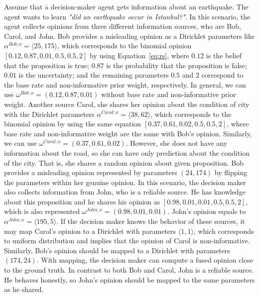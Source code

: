 \documentclass[a4,12pt]{ozu-thesis}
\begin{document}
Assume that a decision-maker agent gets information about an earthquake. The agent wants to learn \textit{"did an earthquake occur in Istanbul?"}. In this scenario, the agent collects opinions from three different information sources, who are Bob, Carol, and John. Bob provides a misleading opinion as a Dirichlet parameters like $\alpha^{Bob:x} = \langle 25, 175 \rangle$, which corresponds to the binomial opinion  $\left [ 0.12, 0.87, 0.01, 0.5, 0.5, 2 \right ]$  by using Equation~\ref{eq:rs}, where $0.12$ is the belief that the proposition is true; $0.87$ is the probability that the proposition is false; $0.01$ is the uncertainty; and the remaining parameters $0.5$ and $2$ correspond to the base rate and non-informative prior weight, respectively. In general, we can use $\omega^{Bob:x} = \left ( 0.12, 0.87, 0.01 \right ) $ without base rate and non-informative prior weight. Another source Carol, she shares her opinion about the condition of city with the Dirichlet parameters $\alpha^{Carol:x} = \langle 38, 62 \rangle$, which corresponds to the binomial opinion by using the same equation  $\left [ 0.37, 0.61, 0.02, 0.5, 0.5, 2 \right ]$, where base rate and non-informative weight are the same with Bob's opinion. Similarly, we can use $\omega^{Carol:x} = \left ( 0.37, 0.61, 0.02 \right ) $. However, she does not have any information about the road, so she can have only prediction about the condition of the city. That is, she shares a random opinion about given proposition. Bob provides a misleading opinion represented by parameters $\left( 24, 174 \right)$ by flipping the parameters within her genuine opinion.  In this scenario, the decision maker also collects information from John, who is a reliable source. He has knowledge about this proposition and he shares his opinion as $\left [ 0.98, 0.01, 0.01, 0.5, 0.5, 2 \right ]$, which is also represented $\omega^{John:x} = \left( 0.98, 0.01, 0.01\right)$. John's opinion equals to $\alpha^{John:x} = \langle 195, 5 \rangle$. If the decision maker knows the behavior of these sources, it may map Carol's opinion to a Dirichlet with parameters $\langle1, 1\rangle$, which corresponds to uniform distribution and implies that the opinion of Carol is non-informative. Similarly, Bob's opinion should be mapped to a Dirichlet with parameters $\left( 174, 24 \right)$. With mapping, the decision maker can compute a fused opinion close to the ground truth. In contrast to both Bob and Carol, John is a reliable source. He behaves honestly, so John’s opinion should be mapped to the same parameters as he shared. 
\end{document}
